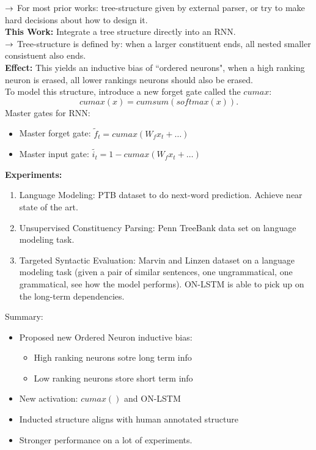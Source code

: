 $\rightarrow$ For most prior works: tree-structure given by external parser, or try to make hard decisions about how to design it. \\

{\bf This Work:} Integrate a tree structure directly into an RNN. \\

$\rightarrow$ Tree-structure is defined by: when a larger constituent ends, all nested smaller consistuent also ends. \\

{\bf Effect:} This yields an inductive bias of ``ordered neurons", when a high ranking neuron is erased, all lower rankings neurons should also be erased. \\

To model this structure, introduce a new forget gate called the $cumax$:
\begin{equation}
    cumax(x) = cumsum(softmax(x)).
\end{equation}
Master gates for RNN:
\begin{itemize}
    \item Master forget gate:
    $\tilde{f}_t = cumax(W_f x_t + \ldots)$
    \item Master input gate:
    $\tilde{i_t} = 1 - cumax(W_f x_t + \ldots)$
\end{itemize}

{\bf Experiments:}
\begin{enumerate}
    \item Language Modeling: PTB dataset to do next-word prediction. Achieve near state of the art.
    
    \item Unsupervised Constituency Parsing: Penn TreeBank data set on language modeling task.
    
    \item Targeted Syntactic Evaluation: Marvin and Linzen dataset on a language modeling task (given a pair of similar sentences, one ungrammatical, one grammatical, see how the model performs). ON-LSTM is able to pick up on the long-term dependencies.
\end{enumerate}

Summary:
\begin{itemize}
    \item Proposed new Ordered Neuron inductive bias:
    \begin{itemize}
        \item High ranking neurons sotre long term info
        \item Low ranking neurons store short term info
    \end{itemize}
    \item New activation: $cumax()$ and ON-LSTM
    \item Inducted structure aligns with human annotated structure
    \item Stronger performance on a lot of experiments.
\end{itemize}

